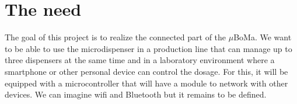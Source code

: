 \section{The need}
\label{sec:context:need}

The goal of this project is to realize the connected part of the $\mu$BoMa.
We want to be able to use the microdispenser in a production line that can manage up to three dispensers at the same time and in a laboratory environment where a smartphone or other personal device can control the dosage.
For this, it will be equipped with a microcontroller that will have a module to network with other devices.
We can imagine wifi and Bluetooth but it remains to be defined.

